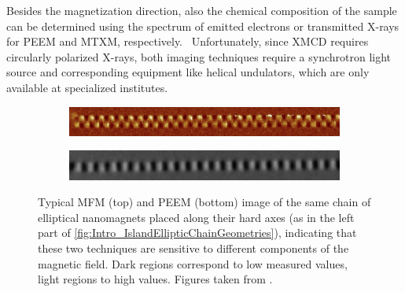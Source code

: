 \documentclass[11pt,a4paper,english]{article}
\begin{document}
Besides the magnetization direction, also the chemical composition of the sample can be determined using the spectrum of emitted electrons or transmitted X-rays for PEEM and MTXM, respectively.~\cite{PEEM,Imaging_MTXM} Unfortunately, since XMCD requires circularly polarized X-rays, both imaging techniques require a synchrotron light source and corresponding equipment like helical undulators, which are only available at specialized institutes.

\begin{figure}
     \centering
     \begin{subfigure}[b]{0.8\textwidth}
         \centering
         \includegraphics[width=\textwidth]{Figures/Introduction/NML_Carlton - Figure 1.15 cropped.png}
     \end{subfigure}
     \begin{subfigure}[b]{0.8\textwidth}
         \centering
         \includegraphics[width=\textwidth]{Figures/Introduction/NML_Carlton - Figure 1.17 cropped.png}
     \end{subfigure}
     \caption{Typical MFM (top) and PEEM (bottom) image of the same chain of elliptical nanomagnets placed along their hard axes (as in the left part of \cref{fig:Intro_IslandEllipticChainGeometries}), indicating that these two techniques are sensitive to different components of the magnetic field. Dark regions correspond to low measured values, light regions to high values. Figures taken from \cite{NML_Carlton}.}
     \label{fig:Intro_Imaging}
\end{figure}
\end{document}
